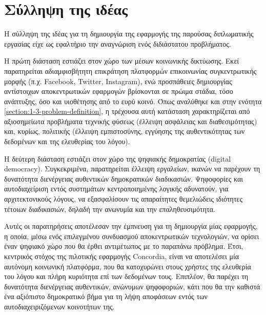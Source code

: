 \section{Σύλληψη της ιδέας} \label{section:3-1-idea-conception}

Η σύλληψη της ιδέας για τη δημιουργία της εφαρμογής της παρούσας διπλωματικής εργασίας είχε ως εφαλτήριο την αναγνώριση ενός διδιάστατου προβλήματος.

Η πρώτη διάσταση εστιάζει στον χώρο των μέσων κοινωνικής δικτύωσης. Εκεί παρατηρείται αδιαμφισβήτητη επικράτηση πλατφορμών επικοινωνίας συγκεντρωτικής μορφής (π.χ. Facebook, Twitter, Instagram), ενώ προσπάθειες δημιουργίας αντίστοιχων αποκεντρωτικών εφαρμογών βρίσκονται σε πρώιμα στάδια, τόσο ανάπτυξης, όσο και υιοθέτησης από το ευρύ κοινό. Όπως αναλύθηκε και στην ενότητα \ref{section:1-3-problem-definition}, η τρέχουσα αυτή κατάσταση χαρακτηρίζεται από αξιοσημείωτα προβλήματα τεχνικής φύσεως (έλλειψη ασφάλειας και διαθεσιμότητας) και, κυρίως, πολιτικής (έλλειψη εμπιστοσύνης, εγγύησης της αυθεντικότητας των δεδομένων και της ελευθερίας του λόγου).

Η δεύτερη διάσταση εστιάζει στον χώρο της ψηφιακής δημοκρατίας (digital democracy). Συγκεκριμένα, παρατηρείται έλλειψη  εργαλείων, ικανών να παρέχουν τη δυνατότητα διενέργειας αυθεντικών δημοκρατικών διαδικασιών. Ψηφοφορίες και αυτοδιαχείριση εντός συστημάτων κεντροποιημένης λογικής αδυνατούν, για αρχιτεκτονικούς λόγους, να εξασφαλίσουν τις απαραίτητες θεμελιώδεις ιδιότητες τέτοιων διαδικασιών, δηλαδή την ανωνυμία και την επαληθευσιμότητα.

Αυτές οι παρατηρήσεις αποτέλεσαν την έμπνευση για τη δημιουργία μίας εφαρμογής, η οποία, μέσω ενός επιλεγμένου συνδυασμού αποκεντρωτικών τεχνολογιών, να ορίσει έναν ψηφιακό χώρο που θα έρθει αντιμέτωπος με το παραπάνω πρόβλημα. Έτσι, κεντρικός στόχος της πιλοτικής εφαρμογής Concordia, είναι να αποτελέσει μία αυτόνομη κοινωνική πλατφόρμα, που θα κατοχυρώνει στους χρήστες της ελευθερία του λόγου και πλήρη κυριότητα επί των δεδομένων τους. Επιπλέον, θα παρέχει τη δυνατότητα διενέργειας αυθεντικών, ανώνυμων ψηφοφοριών, κάτι που θα την καθιστά ένα αξιόπιστο δημοκρατικό βήμα για τη λήψη αποφάσεων εντός των αυτοδιαχειριζόμενων κοινοτήτων της.
